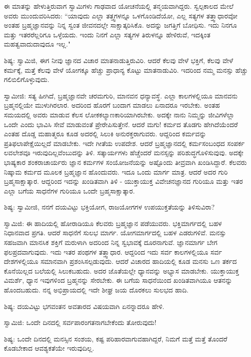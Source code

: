 ಈ ಮಾತನ್ನು ಹೇಳುತ್ತಿರುವಾಗ ಸ್ವಾಮಿಗಳು ಗಾಢವಾದ ಯೋಚನೆಯಲ್ಲಿ ತನ್ಮಯವಾಗಿದ್ದರು. ಸ್ವಲ್ಪಕಾಲದ ಮೇಲೆ ಅವರು ಮುಂದುವರಿಸಿದರು: “ಯಾವುದು ಎಲ್ಲಾ ತತ್ತ್ವಗಳನ್ನೂ ಒಳಗೊಂಡಿದೆಯೋ, ಎಲ್ಲ ಸತ್ಯಗಳ ತತ್ತ್ವಾಧಾರವೋ ಅಂತಹ ಬ್ರಹ್ಮಜ್ಞಾನವನ್ನು ನಿನ್ನ ಸ್ವಂತ ಜೀವನದಲ್ಲೇ ಸಾಕ್ಷಾತ್ಕರಿಸಿಕೊ. ಅದನ್ನು ಜಗತ್ತಿಗೆ ಬೋಧಿಸು. ಇದು ನಿನಗೂ ಮತ್ತು ಇತರರೆಲ್ಲರಿಗೂ ಒಳ್ಳೆಯದು. ಇಂದು ನಿನಗೆ ಎಲ್ಲಾ ಸತ್ಯಗಳ ತಿರುಳನ್ನೂ ಹೇಳಿರುವೆ, ಇದಕ್ಕಿಂತ ಮಹತ್ವವಾದುದಾವುದೂ ಇಲ್ಲ."

ಶಿಷ್ಯ: ಸ್ವಾಮಿಜಿ, ಈಗ ನೀವು ಜ್ಞಾನದ ವಿಚಾರ ಮಾತನಾಡುತ್ತಿರುವಿರಿ. ಆದರೆ ಕೆಲವು ವೇಳೆ ಭಕ್ತಿಗೆ, ಕೆಲವು ವೇಳೆ ಕರ್ಮಕ್ಕೆ, ಮತ್ತೆ ಕೆಲವು ವೇಳೆ ಯೋಗಕ್ಕೂ ಹೆಚ್ಚು ಪ್ರಾಧಾನ್ಯ ಕೊಟ್ಟು ಮಾತನಾಡುವಿರಿ. ಇದರಿಂದ ನಮ್ಮ ಮನಸ್ಸು ಹೆಚ್ಚು ಗಲಿಬಿಲಿಗೊಳ್ಳುವುದು.

ಸ್ವಾಮೀಜಿ: ಸತ್ಯ ಹೀಗಿದೆ, ಬ್ರಹ್ಮಜ್ಞಾನವೇ ಚರಮಗುರಿ, ಮಾನವನ ಧನ್ಯಾವಸ್ಥೆ. ಎಲ್ಲಾ ಕಾಲಗಳಲ್ಲಿಯೂ ಮಾನವನು ಬ್ರಹ್ಮನಲ್ಲಿಯೇ ಮುಳುಗಿರಲಾರ. ಅದರಿಂದ ಹೊರಗೆ ಬಂದಾಗ ಮಾಡಲು ಏನಾದರೂ ಇರಬೇಕು. ಅಂತಹ ಸಮಯದಲ್ಲಿ ಅವರು ಮಾಡುವ ಕೆಲಸ ಲೋಕಕಲ್ಯಾಣಕಾರಿಯಾಗಿರಬೇಕು. ಅದಕ್ಕೇ ನಾನು ನಿಮ್ಮನ್ನು ಜೀವಿಗಳೆಲ್ಲಾ ಒಂದೇ ಎಂದು ಭಾವಿಸಿ ಸೇವೆ ಮಾಡುವಂತೆ ಪ್ರೇರೇಪಿಸುತ್ತೇನೆ. ಆದರೆ ಮಗು! ಕರ್ಮದ ತೊಡಗು ಹೇಗಿದೆಯೆಂದರೆ ಎಂತಹ ದೊಡ್ಡ ಮಹಾತ್ಮರೂ ಕೂಡ ಅದರಲ್ಲಿ ಸಿಲುಕಿ ಅನುರಕ್ತರಾಗುವರು. ಆದ್ದರಿಂದ ಕರ್ಮವನ್ನು ಪ್ರತಿಫಲಾಪೇಕ್ಷೆಯಿಲ್ಲದೆ ಮಾಡಬೇಕು. ಇದೇ ಗೀತೆಯ ಉಪದೇಶ. ಆದರೆ ಬ್ರಹ್ಮಜ್ಞಾನದಲ್ಲಿ ಕರ್ಮಸಂಬಂಧದ ಸಂಪರ್ಕ ಲವಲೇಶವೂ ಇರುವುದಿಲ್ಲವೆಂಬುದನ್ನು ತಿಳಿ. ಸತ್ಕಾರ್ಯಗಳು ಹೆಚ್ಚೆಂದರೆ ಮನಸ್ಸನ್ನು ಪರಿಶುದ್ಧಗೊಳಿಸುವುವು. ಅದಕ್ಕೇ ಭಾಷ್ಯಕಾರ ಶಂಕರಾಚಾರ್ಯರು ಜ್ಞಾನ ಕರ್ಮಗಳ ಸಂಯೋಜನೆಯನ್ನು ಅಷ್ಟೊಂದು ತೀವ್ರವಾಗಿ ಖಂಡಿಸಿದ್ದಾರೆ. ಕೆಲವರು ನಿಷ್ಕಾಮ ಕರ್ಮದ ಮೂಲಕ ಬ್ರಹ್ಮಜ್ಞಾನ ಹೊಂದುವರು. ಇದೂ ಒಂದು ಮಾರ್ಗ ಮಾತ್ರ. ಆದರೆ ಅದರ ಗುರಿ ಬ್ರಹ್ಮಸಾಕ್ಷಾತ್ಕಾರ. ಆದ್ದರಿಂದ ಇದನ್ನು ಖಂಡಿತವಾಗಿ ತಿಳಿ - ಯುಕ್ತಾಯುಕ್ತ ವಿವೇಚನಜ್ಞಾನದ ಗುರಿಯೂ ಮತ್ತು ಇತರ ಎಲ್ಲಾ ಬಗೆಯ ಸಾಧನೆಗಳ ಗುರಿಯೂ ಒಂದೇ ಬ್ರಹ್ಮಸಾಕ್ಷಾತ್ಕಾರ.

ಶಿಷ್ಯ: ಸ್ವಾಮೀಜಿ, ನನಗೆ ದಯವಿಟ್ಟು ಭಕ್ತಿಯೋಗ, ರಾಜಯೋಗಗಳ ಉಪಯುಕ್ತತೆಯನ್ನು ತಿಳಿಸುವಿರಾ?

ಸ್ವಾಮಿಜಿ: ಈ ಹಾದಿಯಲ್ಲಿ ಹೋರಾಡಿಯೂ ಕೆಲವರು ಬ್ರಹ್ಮಜ್ಞಾನ ಪಡೆಯುವರು. ಭಕ್ತಿಮಾರ್ಗದಲ್ಲಿ ಬಹಳ ನಿಧಾನವಾದ ಪ್ರಗತಿ. ಆದರೆ ಸಾಧನೆಗೆ ಸುಲಭ ಮಾರ್ಗ. ಯೋಗಮಾರ್ಗದಲ್ಲಿ ಬಹಳ ಎಡರುಗಳಿವೆ. ಮನಸ್ಸು ಸಹಜವಾಗಿ ಮಾನಸಿಕ ಶಕ್ತಿಗೆ ಮರುಳಾಗಿ ಅದರಿಂದ ನಿನ್ನ ಸ್ವಭಾವಕ್ಕೆ ದೂರನಾಗುವೆ. ಜ್ಞಾನಮಾರ್ಗ ಬೇಗ ಫಲಪ್ರದವಾಗುವುದು. ಇದು ಇತರ ಪಂಥಗಳ ತತ್ತ್ವಾಧಾರ. ಆದ್ದರಿಂದ ಇದು ಸರ್ವ ಕಾಲಗಳಲ್ಲಿಯೂ ಸರ್ವ ದೇಶಗಳಲ್ಲಿಯೂ ಸಮಾನವಾಗಿ ಪ್ರಶಂಸಿಸಲ್ಪಡುವುದು. ಆದರೆ ವಿಚಾರದ ಹಾದಿಯಲ್ಲಿ ಕೂಡ ಮನಸು ಒಣ ತರ್ಕದ ಕೊನೆಯಿಲ್ಲದ ಬಲೆಯಲ್ಲಿ ಸಿಲುಕಬಹುದು. ಅದರ ಜೊತೆಯಲ್ಲೇ ಧ್ಯಾನವನ್ನು ಅಭ್ಯಾಸ ಮಾಡಬೇಕು. ಯುಕ್ತಾಯುಕ್ತ ವಿಮರ್ಶೆ, ಧ್ಯಾನ ಇವುಗಳಿಂದ ಬ್ರಹ್ಮನನ್ನು ಸೇರಬೇಕು. ಈ ಬಗೆಯ ಸಾಧನೆಯಿಂದ ಖಂಡಿತವಾಗಿಯೂ ಆತನನ್ನು ಹೊಂದಬಹುದು. ನನ್ನ ಅಭಿಪ್ರಾಯದಲ್ಲಿ ಇದೇ ಶೀಘ್ರ ಜಯ ದೊರಕಲು ಸುಲಭದ ಹಾದಿ.

ಶಿಷ್ಯ: ದಯವಿಟ್ಟು ಭಗವಂತನ ಅವತಾರದ ವಿಷಯವಾಗಿ ಏನನ್ನಾದರೂ ಹೇಳಿ.

ಸ್ವಾಮಿಜಿ: ಒಂದೇ ದಿನದಲ್ಲಿ ಸರ್ವಪಾರಂಗತನಾಗಬೇಕೆಂದು ತೋರುವುದು!

ಶಿಷ್ಯ: ಒಂದೇ ದಿನದಲ್ಲಿ ಮನಸ್ಸಿನ ಸಂಶಯ, ಕಷ್ಟ ಪರಿಹಾರವಾಗುವಹಾಗಿದ್ದರೆ, ನಿಮಗೆ ಮತ್ತೆ ಮತ್ತೆ ತೊಂದರೆ ಕೊಡಬೇಕಾದ ಆವಶ್ಯಕತೆಯೇ ಇರುವುದಿಲ್ಲ.

